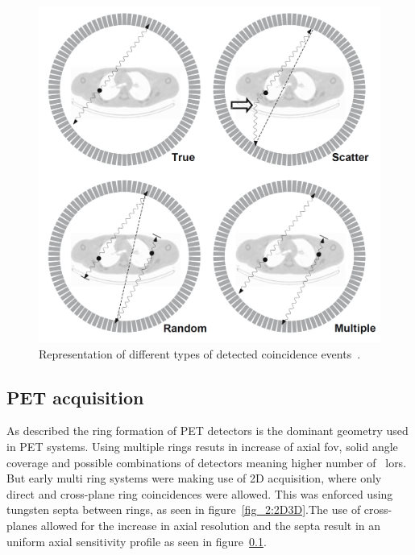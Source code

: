 \begin{figure} [h!]
\centering
\includegraphics[scale=0.22,angle=0]{2_Theory_Methods/figures/Bailey_Scatter_Random_events.png}
\caption{Representation of different types of detected coincidence events~\cite{Bailey2005}. } 
\label{fig_2:BlockDetectorAndRing}
\end{figure} 
%
%
\subsection{PET acquisition}
As described the ring formation of PET detectors is the dominant geometry used in PET systems. Using multiple rings resuts in increase of axial \gls{fov}, solid angle coverage and possible combinations of detectors meaning higher number of ~\glspl{lor}. But early multi ring systems were making use of 2D acquisition, where only direct and cross-plane ring coincidences were allowed. 
This was enforced using tungsten septa between rings, as seen in figure~\ref{fig_2:2D3D}.The use of cross-planes allowed for the increase in axial resolution and the septa result in an uniform axial sensitivity profile as seen in figure~\ref{}. 

